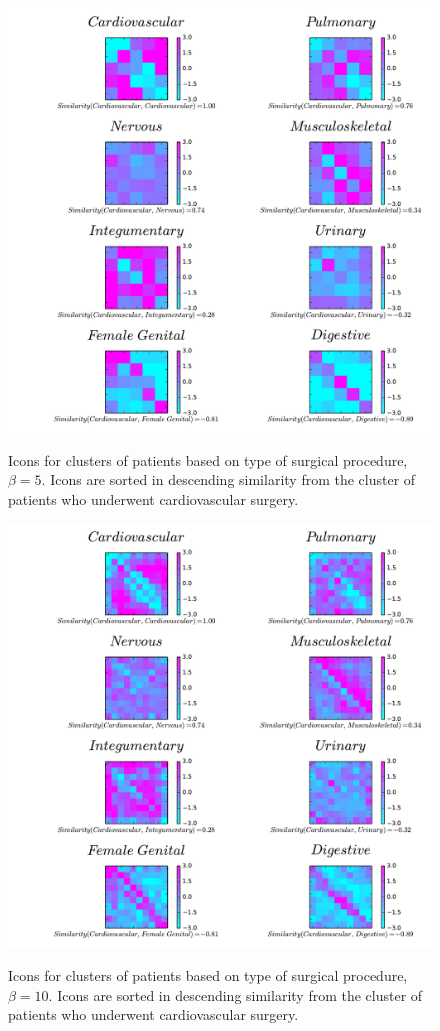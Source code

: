 \begin{figure}[h]
  \includegraphics[scale=0.4]{./Figures/surgerytype_beta5.pdf}\\
  \caption{Icons for clusters of patients based on type of surgical procedure, $\beta=5$. Icons are sorted in descending similarity from the cluster of patients who underwent cardiovascular surgery.}\label{fig:surgerytype_beta5}
\end{figure}

\begin{figure}[h]
  \includegraphics[scale=0.4]{./Figures/surgerytype_beta10.pdf}\\
  \caption{Icons for clusters of patients based on type of surgical procedure, $\beta=10$. Icons are sorted in descending similarity from the cluster of patients who underwent cardiovascular surgery.}\label{fig:surgerytype_beta10}
\end{figure}
